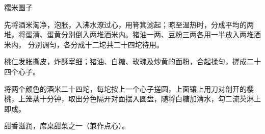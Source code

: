 \begin{recipe}[珍珠圆子]{糯米圆子}

\ingredients


\preparation

\step 先将酒米淘净，泡胀，入沸水潦过心，用筲箕滤起；晾至温热时，分成平均的两
堆，将蛋清、蛋黄分别倒入两堆酒米内。猪油一两、豆粉三两各用一半放入两堆酒米内，
分别调匀，各分成十二坨共二十四坨待用。

\step 桃仁发胀撕皮，炸酥宰细；猪油、白糖、玫瑰及炒黄的面粉，合起揉匀，搓成二十
四个心子。

\step 将两个颜色的酒米二十四坨，每坨按上一个心子搓圆，上面镶上用刀对剖开的樱
桃，上笼蒸十分钟，取出分色隔开对面摆入圆盘，随将白糖加清水，勾二流芡淋上即成。

\features

甜香滋润，席桌甜菜之一（兼作点心）。

\end{recipe}

